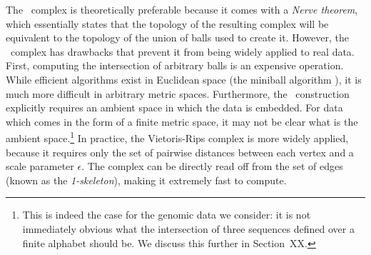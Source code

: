 The \Cech\ complex is theoretically preferable because it comes with a \emph{Nerve theorem}, which essentially states that the topology of the resulting complex will be equivalent to the topology of the union of balls used to create it.
However, the \Cech\ complex has drawbacks that prevent it from being widely applied to real data.
First, computing the intersection of arbitrary balls is an expensive operation.
While efficient algorithms exist in Euclidean space (the miniball algorithm \cite{Gartner:1999}), it is much more difficult in arbitrary metric spaces.
Furthermore, the \Cech\ construction explicitly requires an ambient space in which the data is embedded.
For data which comes in the form of a finite metric space, it may not be clear what is the ambient space.\footnote{This is indeed the case for the genomic data we consider: it is not immediately obvious what the intersection of three sequences defined over a finite alphabet should be. We discuss this further in Section~XX.}
In practice, the Vietoris-Rips complex is more widely applied, because it requires only the set of pairwise distances between each vertex and a scale parameter $\epsilon$.
The complex can be directly read off from the set of edges (known as the \emph{1-skeleton}), making it extremely fast to compute.

